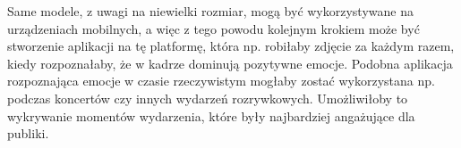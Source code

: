 Same modele, z uwagi na niewielki rozmiar, mogą być wykorzystywane na urządzeniach mobilnych, a więc z tego powodu kolejnym krokiem może być stworzenie aplikacji na tę platformę, która np. robiłaby zdjęcie za każdym razem, kiedy rozpoznałaby, że w kadrze dominują pozytywne emocje. Podobna aplikacja rozpoznająca emocje w czasie rzeczywistym mogłaby zostać wykorzystana np. podczas koncertów czy innych wydarzeń rozrywkowych. Umożliwiłoby to wykrywanie momentów wydarzenia, które były najbardziej angażujące dla publiki. 
